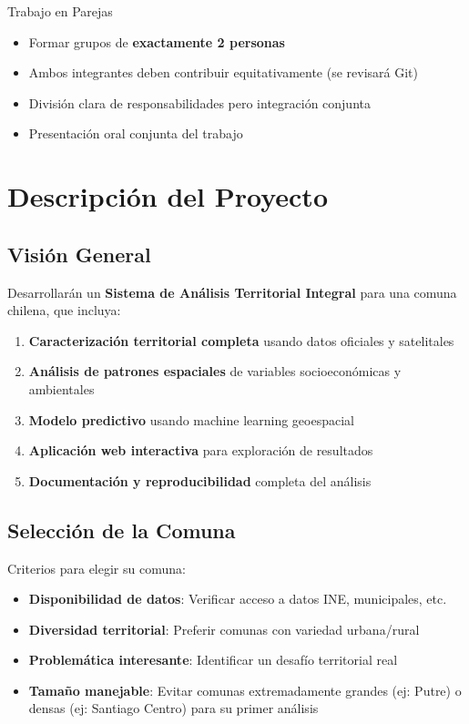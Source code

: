 \documentclass[12pt,a4paper]{article}
\begin{document}
\begin{taskbox}{Trabajo en Parejas}
\begin{itemize}
    \item Formar grupos de \textbf{exactamente 2 personas}
    \item Ambos integrantes deben contribuir equitativamente (se revisará Git)
    \item División clara de responsabilidades pero integración conjunta
    \item Presentación oral conjunta del trabajo
\end{itemize}
\end{taskbox}

\section{Descripción del Proyecto}

\subsection{Visión General}

Desarrollarán un \textbf{Sistema de Análisis Territorial Integral} para una comuna chilena, que incluya:

\begin{enumerate}
    \item \textbf{Caracterización territorial completa} usando datos oficiales y satelitales
    \item \textbf{Análisis de patrones espaciales} de variables socioeconómicas y ambientales
    \item \textbf{Modelo predictivo} usando machine learning geoespacial
    \item \textbf{Aplicación web interactiva} para exploración de resultados
    \item \textbf{Documentación y reproducibilidad} completa del análisis
\end{enumerate}

\subsection{Selección de la Comuna}

\begin{tipbox}
Criterios para elegir su comuna:
\begin{itemize}
    \item \textbf{Disponibilidad de datos}: Verificar acceso a datos INE, municipales, etc.
    \item \textbf{Diversidad territorial}: Preferir comunas con variedad urbana/rural
    \item \textbf{Problemática interesante}: Identificar un desafío territorial real
    \item \textbf{Tamaño manejable}: Evitar comunas extremadamente grandes (ej: Putre) o densas (ej: Santiago Centro) para su primer análisis
\end{itemize}
\end{tipbox}
\end{document}
